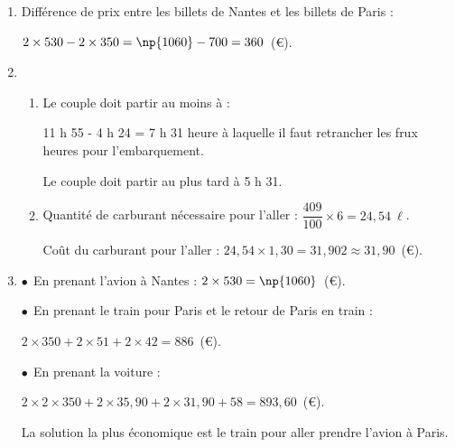 \begin{enumerate}
\item %
Différence de prix entre les billets de Nantes et les billets de Paris :

$2\times 530 - 2\times 350 = \np{1060} - 700 = 360$~(\euro). 
\item %
	\begin{enumerate}
		\item %
Le couple doit partir au moins à :

11 h 55 - 4 h 24 = 7 h 31 heure à laquelle il faut retrancher les frux heures pour l'embarquement.

Le couple doit partir au plus tard à 5 h 31. 
		\item %
Quantité de carburant nécessaire pour l'aller : $\dfrac{409}{100}\times 6 = 24,54~\ell$.

Coût du carburant pour l'aller : $24,54 \times 1,30 = 31,902 \approx 31,90$~(\euro).
	\end{enumerate} 
\item %
$\bullet~~$En prenant l'avion à Nantes : $2 \times 530 = \np{1060}$~(\euro).

$\bullet~~$En prenant le train pour Paris et le retour de Paris en train : 

$2 \times 350 + 2 \times 51 + 2 \times 42 = 886$~(\euro).

$\bullet~~$En prenant la voiture :

$2 \times 2 \times 350 + 2 \times 35,90 +  2 \times 31,90 + 58 = 893,60$~(\euro).

La solution la plus économique est le train pour aller prendre l'avion à Paris.  
\end{enumerate}
